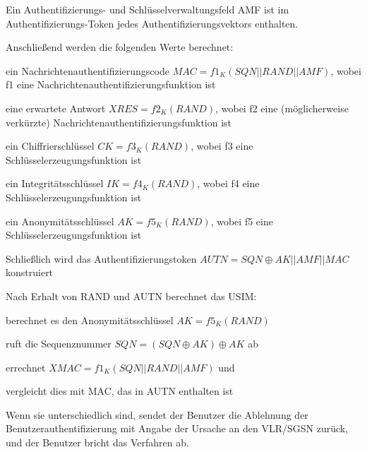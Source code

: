 \documentclass[a4paper]{article}
\begin{document}
\begin{multicols}{3}
\begin{itemize*}
\begin{itemize*}
\begin{itemize*}
                  \end{itemize*}
                  \item Ein Authentifizierungs- und Schlüsselverwaltungsfeld AMF ist im Authentifizierungs-Token jedes Authentifizierungsvektors enthalten.
                  \item Anschließend werden die folgenden Werte berechnet:
                  \begin{itemize*} 
                        \item ein Nachrichtenauthentifizierungscode $MAC = f1_K(SQN || RAND || AMF)$, wobei f1 eine Nachrichtenauthentifizierungsfunktion ist 
                        \item eine erwartete Antwort $XRES = f2_K(RAND)$, wobei f2 eine (möglicherweise verkürzte) Nachrichtenauthentifizierungsfunktion ist 
                        \item ein Chiffrierschlüssel $CK = f3_K(RAND)$, wobei f3 eine Schlüsselerzeugungsfunktion ist 
                        \item ein Integritätsschlüssel $IK = f4_K(RAND)$, wobei f4 eine Schlüsselerzeugungsfunktion ist 
                        \item ein Anonymitätsschlüssel $AK = f5_K(RAND)$, wobei f5 eine Schlüsselerzeugungsfunktion ist 
                  \end{itemize*}
                  \item Schließlich wird das Authentifizierungstoken $AUTN = SQN \oplus AK || AMF || MAC$ konstruiert
            \end{itemize*}
            \begin{itemize*}
                  \item Nach Erhalt von RAND und AUTN berechnet das USIM:
                  \item berechnet es den Anonymitätsschlüssel $AK = f5_K (RAND)$
                  \item ruft die Sequenznummer $SQN = (SQN \oplus AK) \oplus AK$ ab
                  \item errechnet $XMAC = f1_K (SQN || RAND || AMF)$ und
                  \item vergleicht dies mit MAC, das in AUTN enthalten ist
                  \item Wenn sie unterschiedlich sind, sendet der Benutzer die Ablehnung der Benutzerauthentifizierung mit Angabe der Ursache an den VLR/SGSN zurück, und der Benutzer bricht das Verfahren ab.

\end{itemize*}
\end{itemize*}
\end{multicols}
\end{document}
